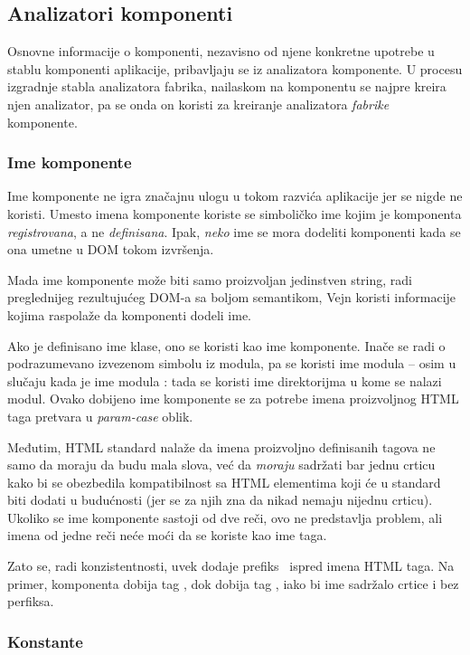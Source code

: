 \subsection{Analizatori komponenti}

Osnovne informacije o komponenti, nezavisno od njene konkretne upotrebe u stablu komponenti aplikacije, pribavljaju se iz analizatora komponente.
U procesu izgradnje stabla analizatora fabrika, nailaskom na komponentu se najpre kreira njen analizator, pa se onda on koristi za kreiranje analizatora \emph{fabrike} komponente.

\subsubsection{Ime komponente}

Ime komponente ne igra značajnu ulogu u tokom razvića aplikacije jer se nigde ne koristi.
Umesto imena komponente koriste se simboličko ime kojim je komponenta \emph{registrovana}, a ne \emph{definisana}.
Ipak, \emph{neko} ime se mora dodeliti komponenti kada se ona umetne u DOM tokom izvršenja.

Mada ime komponente može biti samo proizvoljan jedinstven string, radi preglednijeg rezultujućeg DOM-a sa boljom semantikom, Vejn koristi informacije kojima raspolaže da komponenti dodeli ime.

Ako je definisano ime klase, ono se koristi kao ime komponente.
Inače se radi o podrazumevano izvezenom simbolu iz modula, pa se koristi ime modula -- osim u slučaju kada je ime modula : tada se koristi ime direktorijma u kome se nalazi modul.
Ovako dobijeno ime komponente se za potrebe imena proizvoljnog HTML taga pretvara u \textit{param-case} oblik.

Međutim, HTML standard nalaže da imena proizvoljno definisanih tagova ne samo da moraju da budu mala slova, već da \emph{moraju} sadržati bar jednu crticu kako bi se obezbedila kompatibilnost sa HTML elementima koji će u standard biti dodati u budućnosti (jer se za njih zna da nikad nemaju nijednu crticu).
Ukoliko se ime komponente sastoji od dve reči, ovo ne predstavlja problem, ali imena od jedne reči neće moći da se koriste kao ime taga.

Zato se, radi konzistentnosti, uvek dodaje prefiks~ ispred imena HTML taga.
Na primer, komponenta  dobija tag , dok  dobija tag , iako bi ime sadržalo crtice i bez perfiksa.

\subsubsection{Konstante}\label{sec:konstante}

